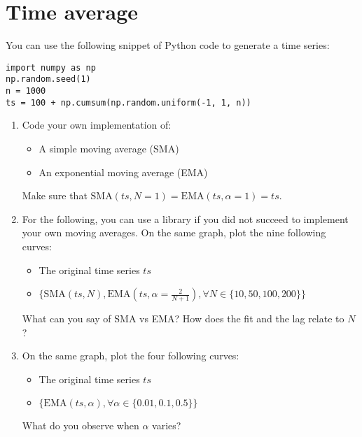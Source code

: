 \section{Time average}

You can use the following snippet of Python code to generate a time series:

\begin{verbatim}
import numpy as np
np.random.seed(1)
n = 1000
ts = 100 + np.cumsum(np.random.uniform(-1, 1, n))
\end{verbatim}

\begin{enumerate}
    \item Code your own implementation of:
        \begin{itemize}
            \item A simple moving average (SMA)
            \item An exponential moving average (EMA)
        \end{itemize}
        Make sure that $\mathrm{SMA}(ts, N=1) = \mathrm{EMA}(ts, \alpha=1) = ts$.
    \item For the following, you can use a library if you did not succeed to implement your own moving averages. On the same graph, plot the nine following curves:
        \begin{itemize}
            \item The original time series $ts$ 
            \item $\{ \mathrm{SMA}(ts, N), \mathrm{EMA}(ts, \alpha=\frac{2}{N+1}), \forall N \in \{10, 50, 100, 200\} \} $
        \end{itemize}
    What can you say of SMA vs EMA? How does the fit and the lag relate to $N$?  
    \item On the same graph, plot the four following curves:
        \begin{itemize}
            \item The original time series $ts$ 
            \item $\{ \mathrm{EMA}(ts, \alpha), \forall \alpha \in \{0.01, 0.1, 0.5 \} \} $
        \end{itemize}
        What do you observe when $\alpha$ varies?
\end{enumerate}

  

